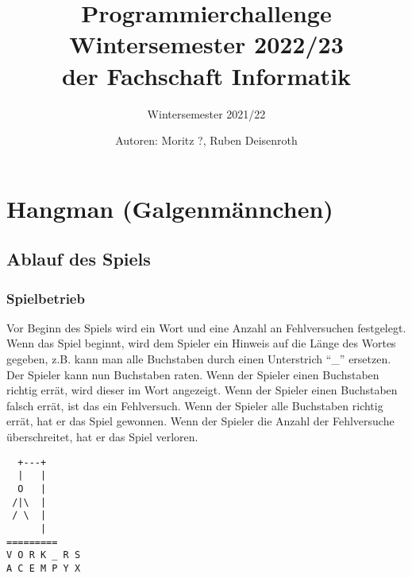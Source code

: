 \documentclass[ngerman,accentcolor=3c,colorbacktitle,12pt]{tudaexercise}
\begin{document}
\title{Programmierchallenge Wintersemester 2022/23 \\ {\small der Fachschaft Informatik}}
\subtitle{Wintersemester 2021/22}
\author{Autoren: Moritz ?, Ruben Deisenroth}
\maketitle

\section*{Hangman (Galgenmännchen) \hyperref[footnote:1]{\footnotemark[1]}}
\subsection*{Ablauf des Spiels}
\subsubsection*{Spielbetrieb}
\begin{minipage}[t]{.7\textwidth}
    Vor Beginn des Spiels wird ein Wort und eine Anzahl an Fehlversuchen festgelegt. Wenn das Spiel beginnt, wird dem Spieler ein Hinweis auf die Länge des Wortes gegeben, z.B. kann man alle Buchstaben durch einen Unterstrich \enquote{\_} ersetzen. Der Spieler kann nun Buchstaben raten. Wenn der Spieler einen Buchstaben richtig errät, wird dieser im Wort angezeigt. Wenn der Spieler einen Buchstaben falsch errät, ist das ein Fehlversuch. Wenn der Spieler alle Buchstaben richtig errät, hat er das Spiel gewonnen. Wenn der Spieler die Anzahl der Fehlversuche überschreitet, hat er das Spiel verloren.
\end{minipage}%
\begin{minipage}[t]{.3\textwidth}%
    \centering%
    \captionsetup{type=figure}
    \begin{BVerbatim}
  +---+
  |   |
  O   |
 /|\  |
 / \  |
      |
=========
V O R K _ R S
A C E M P Y X
    \end{BVerbatim}
\end{minipage}%
\end{document}

